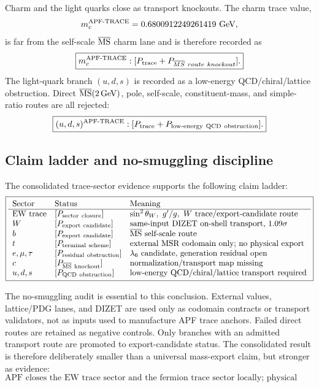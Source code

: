 Charm and the light quarks close as transport knockouts.  The charm trace value,
\[
 m_c^{\rm APF\text{-}TRACE}=0.6800912249261419\ {\rm GeV},
\]
is far from the self-scale \(\overline{\rm MS}\) charm lane and is therefore recorded as
\[
\boxed{
 m_c^{\rm APF\text{-}TRACE}:[P_{\rm trace}+P_{\overline{MS}\ route\ knockout}].
}
\]
The light-quark branch \((u,d,s)\) is recorded as a low-energy QCD/chiral/lattice obstruction.  Direct \(\overline{\rm MS}(2\,{\rm GeV})\), pole, self-scale, constituent-mass, and simple-ratio routes are all rejected:
\[
\boxed{
(u,d,s)^{\rm APF\text{-}TRACE}:
[P_{\rm trace}+P_{\rm low\text{-}energy\ QCD\ obstruction}].
}
\]

\subsection{Claim ladder and no-smuggling discipline}
\label{subsec:trace-sector-claim-ladder}

The consolidated trace-sector evidence supports the following claim ladder:
\[
\boxed{
\begin{array}{lll}
\text{Sector} & \text{Status} & \text{Meaning}\\
\hline
\text{EW trace} & [P_{\rm sector\ closure}] & \sin^2\theta_W,\ g'/g,\ W\ \text{trace/export-candidate route}\\
W & [P_{\rm export\ candidate}] & \text{same-input DIZET on-shell transport, }1.09\sigma\\
b & [P_{\rm export\ candidate}] & \overline{\rm MS}\ \text{self-scale route}\\
t & [P_{\rm terminal\ scheme}] & \text{external MSR codomain only; no physical export}\\
e,\mu,\tau & [P_{\rm residual\ obstruction}] & \lambda_6\ \text{candidate, generation residual open}\\
c & [P_{\overline{\rm MS}\ \rm knockout}] & \text{normalization/transport map missing}\\
u,d,s & [P_{\rm QCD\ obstruction}] & \text{low-energy QCD/chiral/lattice transport required}
\end{array}}
\]

The no-smuggling audit is essential to this conclusion.  External values, lattice/PDG lanes, and DIZET are used only as codomain contracts or transport validators, not as inputs used to manufacture APF trace anchors.  Failed direct routes are retained as negative controls.  Only branches with an admitted transport route are promoted to export-candidate status.  The consolidated result is therefore deliberately smaller than a universal mass-export claim, but stronger as evidence:
\[
\boxed{
\text{APF closes the EW trace sector and the fermion trace sector locally; physical export is admitted only route by route.}
}
\]
